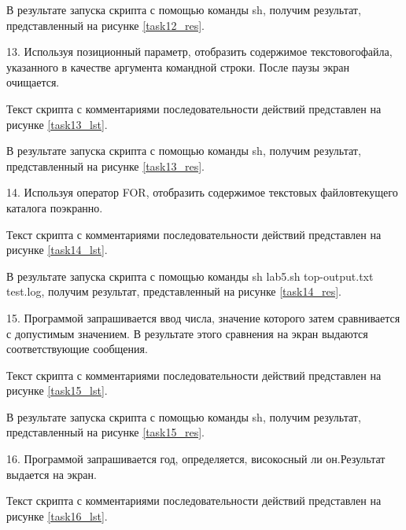 В результате запуска скрипта с помощью команды sh, получим результат, представленный на рисунке \ref{task12_res}.


13. Используя позиционный параметр, отобразить содержимое текстовогофайла, указанного в качестве аргумента командной строки. После паузы экран очищается.

Текст скрипта с комментариями последовательности действий представлен на рисунке \ref{task13_lst}.


В результате запуска скрипта с помощью команды sh, получим результат, представленный на рисунке \ref{task13_res}.


14. Используя оператор FOR, отобразить содержимое текстовых файловтекущего каталога поэкранно.

Текст скрипта с комментариями последовательности действий представлен на рисунке \ref{task14_lst}.


В результате запуска скрипта с помощью команды sh lab5.sh top-output.txt test.log, получим результат, представленный на рисунке \ref{task14_res}.


15. Программой  запрашивается  ввод  числа,  значение  которого  затем сравнивается с допустимым значением. В результате этого сравнения на экран выдаются соответствующие сообщения.

Текст скрипта с комментариями последовательности действий представлен на рисунке \ref{task15_lst}.


В результате запуска скрипта с помощью команды sh, получим результат, представленный на рисунке \ref{task15_res}.


16. Программой  запрашивается  год,  определяется,  високосный  ли  он.Результат выдается на экран.

Текст скрипта с комментариями последовательности действий представлен на рисунке \ref{task16_lst}.

